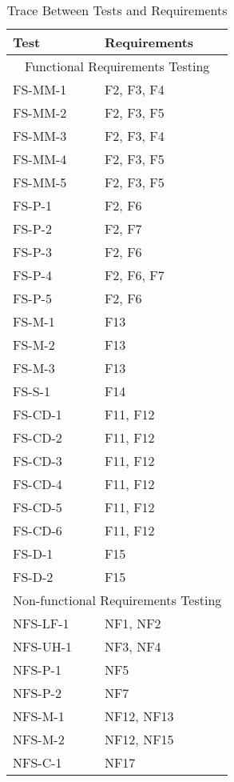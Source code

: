 \documentclass[12pt, titlepage]{article}
\begin{document}
\begin{table}[!htbp]
	\begin{tabular}{ll}
		\toprule
		Test & Requirements \\
		\midrule
		\multicolumn{2}{c}{Functional Requirements Testing} \\
		\midrule
		FS-MM-1 & F2, F3, F4 \\
		FS-MM-2 & F2, F3, F5 \\
		FS-MM-3 & F2, F3, F4 \\
		FS-MM-4 & F2, F3, F5 \\
		FS-MM-5 & F2, F3, F5 \\
		FS-P-1 & F2, F6 \\
		FS-P-2 & F2, F7 \\
		FS-P-3 & F2, F6 \\
		FS-P-4 & F2, F6, F7 \\
		FS-P-5 & F2, F6 \\
		FS-M-1 & F13 \\
		FS-M-2 & F13 \\
		FS-M-3 & F13 \\
		FS-S-1 & F14\\
		FS-CD-1 & F11, F12 \\
		FS-CD-2 & F11, F12 \\
		FS-CD-3 & F11, F12 \\
		FS-CD-4 & F11, F12 \\
		FS-CD-5 & F11, F12 \\
		FS-CD-6 & F11, F12 \\
		FS-D-1 & F15 \\
		FS-D-2 & F15 \\
		\midrule
		\multicolumn{2}{c}{Non-functional Requirements Testing} \\
		\midrule
		NFS-LF-1 & NF1, NF2 \\
		NFS-UH-1 & NF3, NF4 \\
		NFS-P-1 & NF5 \\
		NFS-P-2 & NF7 \\
		NFS-M-1 & NF12, NF13 \\
		NFS-M-2 & NF12, NF15 \\
		NFS-C-1 & NF17 \\
		\bottomrule
	\end{tabular}
	\caption{Trace Between Tests and Requirements}
	\makeatletter
	\def\rulecolor#1#{\CT@arc{#1}}
	\def\CT@arc#1#2{%
		\ifdim\baselineskip=\z@\noalign\fi
		{\gdef\CT@arc@{\color#1{#2}}}}
	\let\CT@arc@\relax
	\makeatother
	\label{Table}
\end{table}
\newpage
\end{document}
